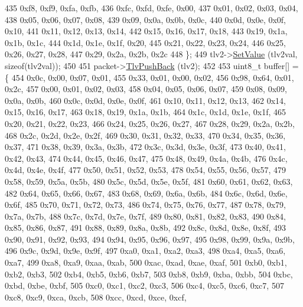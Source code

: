 \begin{DoxyCode}
435       0xf8, 0xf9, 0xfa, 0xfb,
436       0xfc, 0xfd, 0xfe, 0x00,
437       0x01, 0x02, 0x03, 0x04,
438       0x05, 0x06, 0x07, 0x08,
439       0x09, 0x0a, 0x0b, 0x0c,
440       0x0d, 0x0e, 0x0f, 0x10,
441       0x11, 0x12, 0x13, 0x14,
442       0x15, 0x16, 0x17, 0x18,
443       0x19, 0x1a, 0x1b, 0x1c,
444       0x1d, 0x1e, 0x1f, 0x20,
445       0x21, 0x22, 0x23, 0x24,
446       0x25, 0x26, 0x27, 0x28,
447       0x29, 0x2a, 0x2b, 0x2c
448     \};
449     tlv2->\hyperlink{classns3_1_1PbbTlv_a1ca7d32f9b68990225f3267c2cc09f11}{SetValue} (tlv2val, \textcolor{keyword}{sizeof}(tlv2val));
450 
451     packet->\hyperlink{classns3_1_1PbbPacket_a34935793e729a106c176db99c969cb42}{TlvPushBack} (tlv2);
452 
453     uint8\_t buffer[] = \{
454       0x0c, 0x00, 0x07, 0x01,
455       0x33, 0x01, 0x00, 0x02,
456       0x98, 0x64, 0x01, 0x2c,
457       0x00, 0x01, 0x02, 0x03,
458       0x04, 0x05, 0x06, 0x07,
459       0x08, 0x09, 0x0a, 0x0b,
460       0x0c, 0x0d, 0x0e, 0x0f,
461       0x10, 0x11, 0x12, 0x13,
462       0x14, 0x15, 0x16, 0x17,
463       0x18, 0x19, 0x1a, 0x1b,
464       0x1c, 0x1d, 0x1e, 0x1f,
465       0x20, 0x21, 0x22, 0x23,
466       0x24, 0x25, 0x26, 0x27,
467       0x28, 0x29, 0x2a, 0x2b,
468       0x2c, 0x2d, 0x2e, 0x2f,
469       0x30, 0x31, 0x32, 0x33,
470       0x34, 0x35, 0x36, 0x37,
471       0x38, 0x39, 0x3a, 0x3b,
472       0x3c, 0x3d, 0x3e, 0x3f,
473       0x40, 0x41, 0x42, 0x43,
474       0x44, 0x45, 0x46, 0x47,
475       0x48, 0x49, 0x4a, 0x4b,
476       0x4c, 0x4d, 0x4e, 0x4f,
477       0x50, 0x51, 0x52, 0x53,
478       0x54, 0x55, 0x56, 0x57,
479       0x58, 0x59, 0x5a, 0x5b,
480       0x5c, 0x5d, 0x5e, 0x5f,
481       0x60, 0x61, 0x62, 0x63,
482       0x64, 0x65, 0x66, 0x67,
483       0x68, 0x69, 0x6a, 0x6b,
484       0x6c, 0x6d, 0x6e, 0x6f,
485       0x70, 0x71, 0x72, 0x73,
486       0x74, 0x75, 0x76, 0x77,
487       0x78, 0x79, 0x7a, 0x7b,
488       0x7c, 0x7d, 0x7e, 0x7f,
489       0x80, 0x81, 0x82, 0x83,
490       0x84, 0x85, 0x86, 0x87,
491       0x88, 0x89, 0x8a, 0x8b,
492       0x8c, 0x8d, 0x8e, 0x8f,
493       0x90, 0x91, 0x92, 0x93,
494       0x94, 0x95, 0x96, 0x97,
495       0x98, 0x99, 0x9a, 0x9b,
496       0x9c, 0x9d, 0x9e, 0x9f,
497       0xa0, 0xa1, 0xa2, 0xa3,
498       0xa4, 0xa5, 0xa6, 0xa7,
499       0xa8, 0xa9, 0xaa, 0xab,
500       0xac, 0xad, 0xae, 0xaf,
501       0xb0, 0xb1, 0xb2, 0xb3,
502       0xb4, 0xb5, 0xb6, 0xb7,
503       0xb8, 0xb9, 0xba, 0xbb,
504       0xbc, 0xbd, 0xbe, 0xbf,
505       0xc0, 0xc1, 0xc2, 0xc3,
506       0xc4, 0xc5, 0xc6, 0xc7,
507       0xc8, 0xc9, 0xca, 0xcb,
508       0xcc, 0xcd, 0xce, 0xcf,

\end{DoxyCode}
